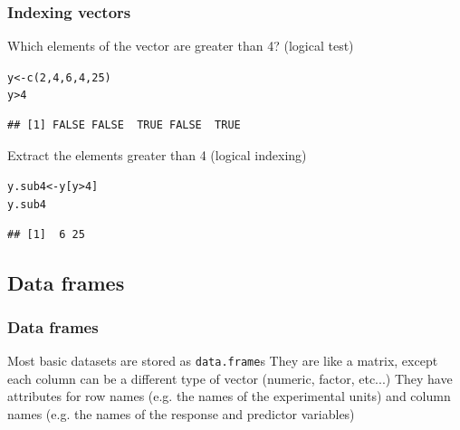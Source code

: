 \documentclass[color=usenames,dvipsnames]{beamer}\usepackage[]{graphicx}\usepackage[]{color}
\makeatletter
\newcommand{\hlnum}[1]{\textcolor[rgb]{0.69,0.494,0}{#1}}%
\newcommand{\hlopt}[1]{\textcolor[rgb]{0,0,0}{#1}}%
\newcommand{\hlstd}[1]{\textcolor[rgb]{0,0,0}{#1}}%
\newcommand{\hlkwb}[1]{\textcolor[rgb]{0,0.341,0.682}{#1}}%
\newcommand{\hlkwd}[1]{\textcolor[rgb]{0.004,0.004,0.506}{#1}}%
\newenvironment{kframe}{%
 \def\at@end@of@kframe{}%
 \ifinner\ifhmode%
  \def\at@end@of@kframe{\end{minipage}}%
  \begin{minipage}{\columnwidth}%
 \fi\fi%
 \def\FrameCommand##1{\hskip\@totalleftmargin \hskip-\fboxsep
 \colorbox{shadecolor}{##1}\hskip-\fboxsep
     \hskip-\linewidth \hskip-\@totalleftmargin \hskip\columnwidth}%
 \MakeFramed {\advance\hsize-\width
   \@totalleftmargin\z@ \linewidth\hsize
   \@setminipage}}%
 {\par\unskip\endMakeFramed%
 \at@end@of@kframe}
\newenvironment{knitrout}{}{} %
\makeatother
\begin{document}
\begin{frame}[fragile]
  \frametitle{Indexing vectors}
  \small
  Which elements of the vector are greater than 4? (logical test)
\begin{knitrout}\small
{}\color{fgcolor}\begin{kframe}
\begin{alltt}
\hlstd{y} \hlkwb{<-} \hlkwd{c}\hlstd{(}\hlnum{2}\hlstd{,} \hlnum{4}\hlstd{,} \hlnum{6}\hlstd{,} \hlnum{4}\hlstd{,} \hlnum{25}\hlstd{)}
\hlstd{y}\hlopt{>}\hlnum{4}
\end{alltt}
\begin{verbatim}
## [1] FALSE FALSE  TRUE FALSE  TRUE
\end{verbatim}
\end{kframe}
\end{knitrout}
\pause \vfill
  Extract the elements greater than 4 (logical indexing)
\begin{knitrout}\small
{}\color{fgcolor}\begin{kframe}
\begin{alltt}
\hlstd{y.sub4} \hlkwb{<-} \hlstd{y[y}\hlopt{>}\hlnum{4}\hlstd{]}
\hlstd{y.sub4}
\end{alltt}
\begin{verbatim}
## [1]  6 25
\end{verbatim}
\end{kframe}
\end{knitrout}
\end{frame}


\subsection{Data frames}


\begin{frame}[fragile]
  \frametitle{Data frames}
  \large
  Most basic datasets are stored as \verb+data.frame+s
  \pause \vfill
  They are like a matrix, except each column can be a
      different type of vector (numeric, factor, etc...)
  \pause \vfill
   They have attributes for row names (e.g. the names of
      the experimental units) and column names (e.g. the names of
      the response and predictor variables)
\end{frame}
\end{document}
